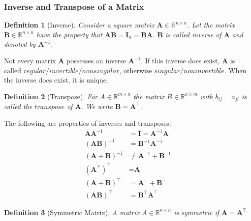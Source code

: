 \documentclass{article}
\newtheorem{definition}{Definition}[section]
\begin{document}
 	\subsubsection{Inverse and Transpose of a Matrix}
 	\begin{definition}[Inverse]
 		\normalfont Consider a square matrix $\textbf{A} \in \mathbb{R}^{n \times n}$. Let the matrix $\textbf{B} \in \mathbb{R}^{n \times n}$ have the property that $\textbf{AB} = \textbf{I}_n = \textbf{BA}$. $\textbf{B}$ is called inverse of $\textbf{A}$ and denoted by $\textbf{A}^{-1}$. 
 	\end{definition}
 	Not every matrix $\textbf{A}$ possesses an inverse $\textbf{A}^{-1}$. If this inverse does exist, $\mathbf{A}$ is called $\textit{regular/invertible/nonsingular}$, otherwise $\textit{singular/noninvertible}$. When the inverse does exist, it is unique. 
 	\begin{definition}[Transpose]
 		For $A \in \mathbb{R}^{m \times n}$ the matrix $B \in \mathbb{R}^{n \times m}$ with $b_{ij} = a_{ji}$ is called the $\textit{transpose}$ of $\mathbf{A}$. We write $\mathbf{B} = \mathbf{A}^{\top}$.
 	\end{definition}
 	The following are properties of inverses and transposes:
 	\begin{align}
 		\textbf{AA}^{-1} &= \textbf{I} = \textbf{A}^{-1}\textbf{A} \\
 		(\textbf{AB})^{-1} &= \textbf{B}^{-1}\textbf{A}^{-1} \\
 		(\textbf{A} + \textbf{B})^{-1} &\ne \textbf{A}^{-1} + \textbf{B}^{-1} \\
 		(\textbf{A}^{\top})^{\top} &= \textbf{A} \\
 		(\textbf{A} + \textbf{B})^{\top} &= \textbf{A}^{\top} + \textbf{B}^{\top} \\
 		(\textbf{AB})^{\top} &= \textbf{B}^{\top}\textbf{A}^{\top}
 	\end{align}
 	\begin{definition}[Symmetric Matrix]
 		A matrix $A \in \mathbb{R}^{n \times n}$ is symmetric if $\textbf{A} = \textbf{A}^{\top}$
 	\end{definition}
\end{document}
